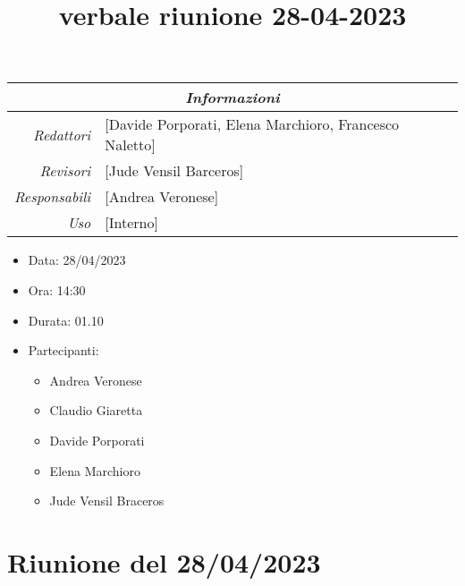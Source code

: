 \documentclass[12pt]{article}
\begin{document}
\graphicspath{ {../templates/img} }

\title{verbale riunione 28-04-2023}

\firstPage
\maketitle

\begin{center}
\begin{tabular}{r | l}
    \multicolumn{2}{c}{\textit{Informazioni}}\\
    \hline
    
        \textit{Redattori} &
        [Davide Porporati, Elena Marchioro, Francesco Naletto]\makecell{}\\
    
        \textit{Revisori} &
        [Jude Vensil Barceros]\makecell{}\\
        \textit{Responsabili} &
        [Andrea Veronese]\makecell{}\\
            \textit{Uso} & 
            [Interno]\makecell{}\\
\end{tabular}
    \begin{itemize}
    \item[] Data: 28/04/2023
    \item[] Ora: 14:30
    \item[] Durata: 01.10
    \item[] Partecipanti:
    \begin{itemize}
    \item[] Andrea Veronese
    \item[] Claudio Giaretta
    \item[] Davide Porporati
    \item[] Elena Marchioro
    \item[] Jude Vensil Braceros
    \end{itemize}
    \end{itemize}
\end{center}


\tableofcontents
\printindex 
\section{Riunione del 28/04/2023}
\end{document}

